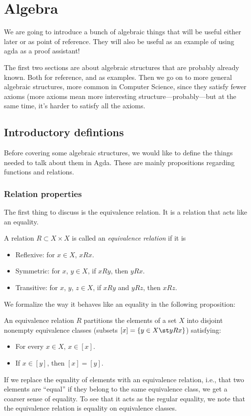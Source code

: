 \newcommand{\nanring}{non-associative non-ring}
\newcommand{\Nanring}{Non-associative non-ring}
\section{Algebra}
We are going to introduce a bunch of algebraic things that will be useful either later or as point of reference. They will also be useful as an example of using agda as a proof assistant!

The first two sections are about algebraic structures that are probably already known. Both for reference, and as examples. Then we go on to more general algebraic structures, more common in Computer Science, since they satisfy fewer axioms (more axioms mean more interesting structure---probably---but at the same time, it's harder to satisfy all the axioms.
\subsection{Introductory defintions}
Before covering some algebraic structures, we would like to define the things needed to talk about them in Agda. These are mainly propositions regarding functions and relations.
\subsubsection{Relation properties}
The first thing to discuss is the equivalence relation. It is a relation that acts like an equality.
\begin{Definition}
  A relation $R \subset X \times X$ is called an \emph{equivalence relation} if it is
  \begin{itemize}
  \item Reflexive: for $x \in X$, $x R x$.
  \item Symmetric: for $x$, $y \in X$, if $x R y$, then $y R x$.
  \item Transitive: for $x$, $y$, $z \in X$, if $x R y$ and $y R z$, then $x R z$.
  \end{itemize}
\end{Definition}
We formalize the way it behaves like an equality in the following proposition:
\begin{Proposition}
An equivalence relation $R$ partitions the elements of a set $X$ into disjoint nonempty equivalence classes (subsets $[x] = \{y \in X \st y R x\}$) satisfying: 
\begin{itemize}
\item For every $x \in X$, $x \in [x]$.
\item If $x \in [y]$, then $[x] = [y]$.
\end{itemize}
\end{Proposition}
If we replace the equality of elements with an equivalence relation, i.e., that two elements are ``equal'' if they belong to the same equivalence class, we get a coarser sense of equality. To see that it acts as the regular equality, we note that the equivalence relation is equality on equivalence classes.

